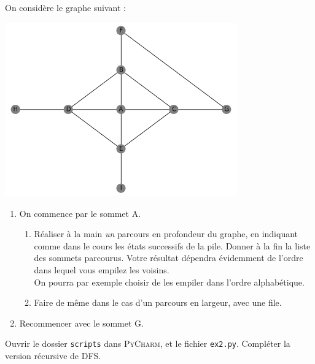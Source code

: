 \documentclass[a4paper,12pt,french]{book}
\begin{document}

\begin{exercice}
On considère le graphe suivant :
\begin{center}
\includegraphics[width=10cm]{img/00.png}
\end{center}
\begin{enumerate}[\bfseries 1.]
	\item On commence par le sommet A.
    \begin{enumerate}[\bfseries a.]
    	\item Réaliser à la main \textit{un} parcours en profondeur du graphe, en indiquant comme dans le cours les états successifs de la pile. Donner à la fin la liste des sommets parcourus. Votre résultat dépendra évidemment de l'ordre dans lequel vous empilez les voisins.\\
        On pourra par exemple choisir de les empiler dans l'ordre alphabétique.
        \item Faire de même dans le cas d'un parcours en largeur, avec une file.
    \end{enumerate}
    \item Recommencer avec le sommet G.
\end{enumerate}
\end{exercice}

\begin{exercice}
Ouvrir le dossier \texttt{scripts} dans \textsc{PyCharm}, et le fichier \texttt{ex2.py}. Compléter la version récursive de DFS.
\end{exercice}
\end{document}
